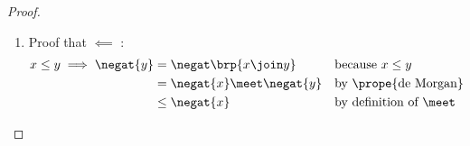 \begin{proof}
\begin{enumerate}
\begin{enumerate}
      \item Proof that $\negat(x\meet y) = \negat{x} \join \negat{y}$:
        \begin{align*}
          \negat(x\meet y)
            &\ge \negat{x} \join \negat{y}
            &&   \text{by \pref{lem:latn_demorgan_ineq}}
            \\
          \negat(x\meet y)
            &=   \negat\brs{\negat\negat{x} \meet \negat\negat{y}}
            &&   \text{by \prope{involutory} property \xref{def:latn}}
          \\&\le \negat{x} \join \negat{y}
            &&   \text{by \pref{item:latn_demorgan_xojoinyo}}
        \end{align*}
    
      \item Proof that $\negat(x\join y) = \negat{x} \meet \negat{y}$:
        \begin{align*}
          \negat(x\join y)
            &\ge \negat{x} \meet \negat{y}
            &&   \text{by \pref{lem:latn_demorgan_ineq}}
            \\
          \negat(x\join y)
            &=   \negat\brs{\negat\negat{x} \join \negat\negat{y}}
            &&   \text{by \prope{involutory} property \xref{def:latn}}
          \\&\le \negat{x} \meet \negat{y}
            &&   \text{by \pref{item:latn_demorgan_xomeetyo}}
        \end{align*}
    
    \end{enumerate}

  \item Proof that  $\impliedby$ :
    \begin{align*}
      x\le y \implies \negat{y}
        &= \negat\brp{x \join y}
        && \text{because $x\le y$}
      \\&= \negat{x} \meet \negat{y}
        && \text{by \prope{de Morgan}}
      \\&\le \negat{x}
        && \text{by definition of $\meet$}
    \end{align*}
\end{enumerate}
\end{proof}

